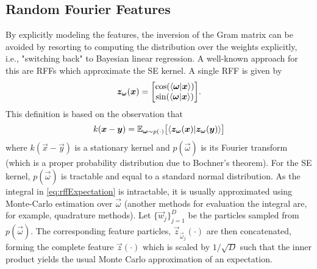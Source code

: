 
\subsection{Random Fourier Features}
	By explicitly modeling the features, the inversion of the Gram matrix can be avoided by resorting to computing the distribution over the weights explicitly, i.e., "switching back" to Bayesian linear regression.
	A well-known approach for this are \acp{RFF}\cite{rahimiRandomFeaturesLargeScale2007} which approximate the \ac{SE} kernel.
	A single \ac{RFF} is given by
	\begin{equation}
		\vec{z}_{\vec{\omega}}(\vec{x}) =
			\begin{bmatrix}
				\cos(\ip{\vec{\omega}}{\vec{x}}) \\
				\sin(\ip{\vec{\omega}}{\vec{x}})
			\end{bmatrix}\!.
		\label{eq:rffFeature}
	\end{equation}
	This definition is based on the observation that
	\begin{equation}
		k(\vec{x} - \vec{y}) = \E_{\vec{\omega} \sim p(\cdot)}\bigl[ \ip{\vec{z}_{\vec{\omega}}(\vec{x})}{\vec{z}_{\vec{\omega}}(\vec{y})} \bigr]
		\label{eq:rffExpectation}
	\end{equation}
	where $k(\vec{x} - \vec{y})$ is a stationary kernel and $p(\vec{\omega})$ is its Fourier transform (which is a proper probability distribution due to Bochner's theorem\cite{steinInterpolationSpatialData1999}).
	For the \ac{SE} kernel, $p(\vec{\omega})$ is tractable and equal to a standard normal distribution\cite{rasmussenGaussianProcessesMachine2006}.
	As the integral in \cref{eq:rffExpectation} is intractable, it is usually approximated using Monte-Carlo estimation over $\vec{\omega}$ (another methods for evaluation the integral are, for example, quadrature methods\cite{daoGaussianQuadratureKernel2017}).
	Let $\{ \vec{w}_j \}_{j = 1}^{D}$ be the particles sampled from $p(\vec{\omega})$.
	The corresponding feature particles, $\vec{z}_{\vec{\omega}_j}(\cdot)$ are then concatenated, forming the complete feature $\vec{z}(\cdot)$ which is scaled by $1/\sqrt{D}$ such that the inner product yields the usual Monte Carlo approximation of an expectation.

